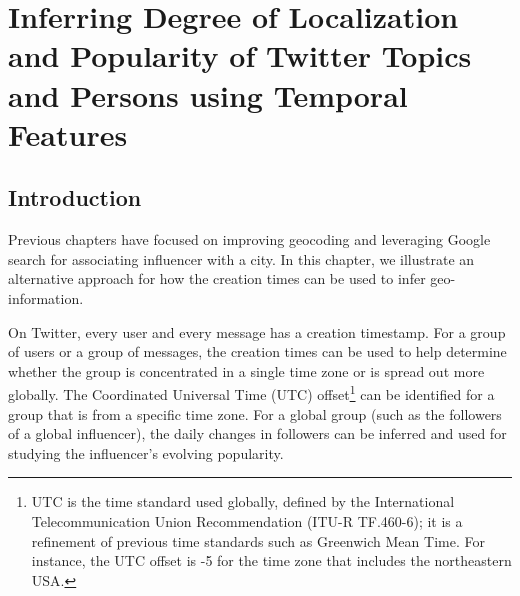 \chapter{Inferring Degree of Localization and Popularity of Twitter Topics and Persons using Temporal Features}\label{chap5}

\setlength{\abovedisplayskip}{-20pt} \setlength{\abovedisplayshortskip}{-15pt}

\section{Introduction}


 
 Previous chapters have focused on improving geocoding and leveraging Google search for associating influencer with a city. In this chapter, we illustrate an alternative approach for how the creation times can be used to infer geo-information. 
 
 On Twitter, every user and every message has a creation timestamp. For a group of users or a group of messages, the creation times can be used %
 to help determine whether the group is concentrated in a single time zone or is spread out more globally. The Coordinated Universal Time (UTC) offset\footnote{UTC is the time standard used globally, defined by the International Telecommunication Union Recommendation (ITU-R TF.460-6); it is a refinement of previous time standards such as Greenwich Mean Time. For instance, the UTC offset is -5 for the time zone that includes the northeastern USA.} 
 can be identified for a group that is from a specific time zone. For a global group (such as the followers of a global influencer), the daily changes in followers can be inferred and used for studying the influencer's evolving popularity.
 
